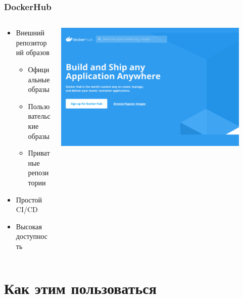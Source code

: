 \documentclass[xetex,mathserif,serif]{beamer}
\begin{document}
    \begin{frame}
        \frametitle{DockerHub}
        \begin{columns}
            \begin{column}{0.5\textwidth}
                \begin{itemize}
                    \item Внешний репозиторий образов
                    \begin{itemize}
                        \item Официальные образы
                        \item Пользовательские образы
                        \item Приватные репозитории
                    \end{itemize}
                    \item Простой CI/CD
                    \item Высокая доступность
                \end{itemize}
            \end{column}
            \begin{column}{0.5\textwidth}
                \includegraphics[width=0.9\textwidth]{dockerHub.png}
            \end{column}
        \end{columns}
    \end{frame}

    \section{Как этим пользоваться}
\end{document}
